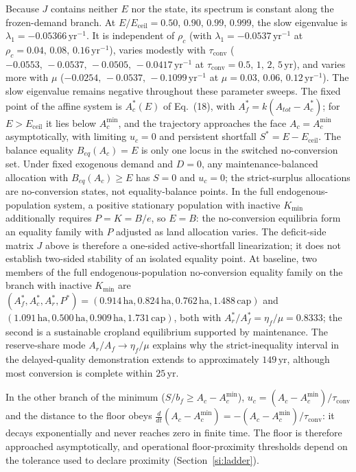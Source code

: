 \documentclass[11pt,a4paper]{article}
\newcommand{\Eceil}{E_{\mathrm{ceil}}}
\newcommand{\Acmin}{A_c^{\min}}
\newcommand{\tconv}{\tau_{\mathrm{conv}}}
\begin{document}
Because $J$ contains neither $E$ nor the state, its spectrum is constant along the frozen-demand branch. At $E/\Eceil=0.50,\,0.90,\,0.99,\,0.999$, the slow eigenvalue is $\lambda_1=-0.05366\,\mathrm{yr}^{-1}$. It is independent of $\rho_c$ (with $\lambda_1=-0.0537\,\mathrm{yr}^{-1}$ at $\rho_c=0.04,\,0.08,\,0.16\,\mathrm{yr}^{-1}$), varies modestly with $\tconv$ ($-0.0553,\,-0.0537,\,-0.0505,\,-0.0417\,\mathrm{yr}^{-1}$ at $\tconv=0.5,\,1,\,2,\,5\,\mathrm{yr}$), and varies more with $\mu$ ($-0.0254,\,-0.0537,\,-0.1099\,\mathrm{yr}^{-1}$ at $\mu=0.03,\,0.06,\,0.12\,\mathrm{yr}^{-1}$). The slow eigenvalue remains negative throughout these parameter sweeps. The fixed point of the affine system is $A_c^*(E)$ of Eq.~(18), with $A_f^*=k(A_{tot}-A_c^*)$; for $E>\Eceil$ it lies below $\Acmin$, and the trajectory approaches the face $A_c=\Acmin$ asymptotically, with limiting $u_c=0$ and persistent shortfall $S^*=E-\Eceil$. The balance equality $B_{eq}(A_c)=E$ is only one locus in the switched no-conversion set. Under fixed exogenous demand and $D=0$, any maintenance-balanced allocation with $B_{eq}(A_c)\ge E$ has $S=0$ and $u_c=0$; the strict-surplus allocations are no-conversion states, not equality-balance points. In the full endogenous-population system, a positive stationary population with inactive $K_{\min}$ additionally requires $P=K=B/e$, so $E=B$: the no-conversion equilibria form an equality family with $P$ adjusted as land allocation varies. The deficit-side matrix $J$ above is therefore a one-sided active-shortfall linearization; it does not establish two-sided stability of an isolated equality point. At baseline, two members of the full endogenous-population no-conversion equality family on the branch with inactive $K_{\min}$ are $(A_f^*,A_c^*,A_r^*,P^*)=(0.914\,\mathrm{ha},0.824\,\mathrm{ha},0.762\,\mathrm{ha},1.488\,\mathrm{cap})$ and $(1.091\,\mathrm{ha},0.500\,\mathrm{ha},0.909\,\mathrm{ha},1.731\,\mathrm{cap})$, both with $A_r^*/A_f^*=\eta_f/\mu=0.8333$; the second is a sustainable cropland equilibrium supported by maintenance. The reserve-share mode $A_r/A_f\to\eta_f/\mu$ explains why the strict-inequality interval in the delayed-quality demonstration extends to approximately $149\,\mathrm{yr}$, although most conversion is complete within $25\,\mathrm{yr}$.

In the other branch of the minimum ($S/b_f\ge A_c-\Acmin$), $u_c=(A_c-\Acmin)/\tconv$ and the distance to the floor obeys $\frac{d}{dt}(A_c-\Acmin)=-(A_c-\Acmin)/\tconv$: it decays exponentially and never reaches zero in finite time. The floor is therefore approached asymptotically, and operational floor-proximity thresholds depend on the tolerance used to declare proximity (Section~\ref{si:ladder}).
\end{document}
